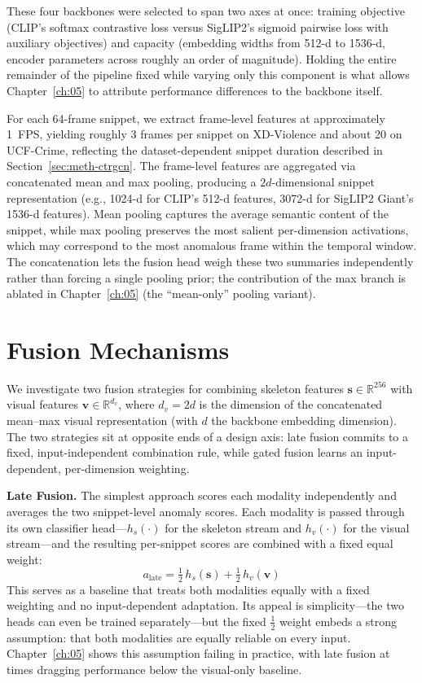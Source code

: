 These four backbones were selected to span two axes at once: training objective (CLIP's softmax
contrastive loss versus SigLIP2's sigmoid pairwise loss with auxiliary objectives) and capacity
(embedding widths from 512-d to 1536-d, encoder parameters across roughly an order of magnitude).
Holding the entire remainder of the pipeline fixed while varying only this component is what
allows Chapter~\ref{ch:05} to attribute performance differences to the backbone itself.

For each 64-frame snippet, we extract frame-level features at approximately 1~FPS, yielding
roughly 3 frames per snippet on XD-Violence and about 20 on UCF-Crime, reflecting the
dataset-dependent snippet duration described in Section~\ref{sec:meth-ctrgcn}. The frame-level
features are aggregated via concatenated mean and max pooling, producing a $2d$-dimensional
snippet representation (e.g., 1024-d for CLIP's 512-d features, 3072-d for SigLIP2 Giant's 1536-d
features). Mean pooling captures the average semantic content of the snippet, while max pooling
preserves the most salient per-dimension activations, which may correspond to the most anomalous
frame within the temporal window. The concatenation lets the fusion head weigh these two
summaries independently rather than forcing a single pooling prior; the contribution of the max
branch is ablated in Chapter~\ref{ch:05} (the ``mean-only'' pooling variant).

\section{Fusion Mechanisms}
\label{sec:meth-fusion}

We investigate two fusion strategies for combining skeleton features $\mathbf{s} \in
\mathbb{R}^{256}$ with visual features $\mathbf{v} \in \mathbb{R}^{d_v}$, where $d_v = 2d$ is the
dimension of the concatenated mean--max visual representation (with $d$ the backbone embedding
dimension). The two strategies sit at opposite ends of a design axis: late fusion commits to a
fixed, input-independent combination rule, while gated fusion learns an input-dependent,
per-dimension weighting.

\textbf{Late Fusion.} The simplest approach scores each modality independently and averages the
two snippet-level anomaly scores. Each modality is passed through its own classifier
head---$h_s(\cdot)$ for the skeleton stream and $h_v(\cdot)$ for the visual stream---and the
resulting per-snippet scores are combined with a fixed equal weight:
\begin{equation}
    a_{\text{late}} = \tfrac{1}{2}\, h_s(\mathbf{s}) + \tfrac{1}{2}\, h_v(\mathbf{v})
\end{equation}
This serves as a baseline that treats both modalities equally with a fixed weighting and no
input-dependent adaptation. Its appeal is simplicity---the two heads can even be trained
separately---but the fixed $\tfrac{1}{2}$ weight embeds a strong assumption: that both modalities
are equally reliable on every input. Chapter~\ref{ch:05} shows this assumption failing in
practice, with late fusion at times dragging performance below the visual-only baseline.

